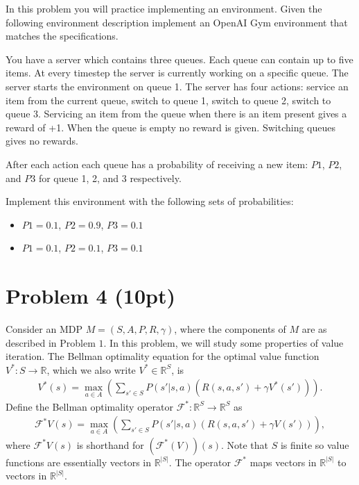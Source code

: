 \documentclass[12pt]{article}
\begin{document}
In this problem you will practice implementing an environment. Given
the following environment description implement an OpenAI Gym
environment that matches the specifications.

You have a server which contains three queues. Each queue can contain
up to five items. At every timestep the server is currently working on
a specific queue. The server starts the environment on queue 1. The
server has four actions: service an item from the current queue,
switch to queue 1, switch to queue 2, switch to queue 3. Servicing an
item from the queue when there is an item present gives a reward of
+1. When the queue is empty no reward is given. Switching queues gives
no rewards.

After each action each queue has a probability of receiving a new
item: $P1$, $P2$, and $P3$ for queue 1, 2, and 3 respectively.

Implement this environment with the following sets of probabilities:
  
\begin{itemize}
\item $P1 = 0.1$, $P2 = 0.9$, $P3 = 0.1$
\item $P1 = 0.1$, $P2 = 0.1$, $P3 = 0.1$
\end{itemize}

\section*{Problem 4 (10pt)}

Consider an MDP $M = (S, A, P, R, \gamma)$, where the components of 
$M$ are as described in Problem $1$. In this problem, we will study some properties
of value iteration. The Bellman optimality equation for the 
optimal value function $V ^* : S \to \mathbb R$, 
which we also write $V ^* \in \mathbb R ^S$, is
\begin{align*}
  V ^*(s) = \max _{a \in A} 
    \left(
      \sum _{s' \in S} 
        P(s' | s, a) \left(
          R (s, a, s') + \gamma V ^*( s' )
        \right)
    \right) .
\end{align*}
Define the Bellman optimality operator 
$\mathcal F ^* : \mathbb R ^{ S } \to \mathbb R ^{ S }$ as 
\begin{align*}
  \mathcal F ^* V (s) 
    = \max _{a \in A} 
      \left(
        \sum _{s' \in S} 
          P(s' | s, a) \left(
            R (s, a, s') + \gamma V ( s' )
          \right)
      \right) ,
\end{align*}
where $\mathcal F ^* V (s)$ is shorthand for $( \mathcal F ^* ( V ) ) (s)$.
Note that $S$ is finite so value functions are essentially vectors in 
$\mathbb R ^{ |S| }$. The operator $\mathcal F ^*$ maps vectors in 
$\mathbb R ^{ |S| }$ to vectors in $\mathbb R ^{ |S| }$.
\end{document}
